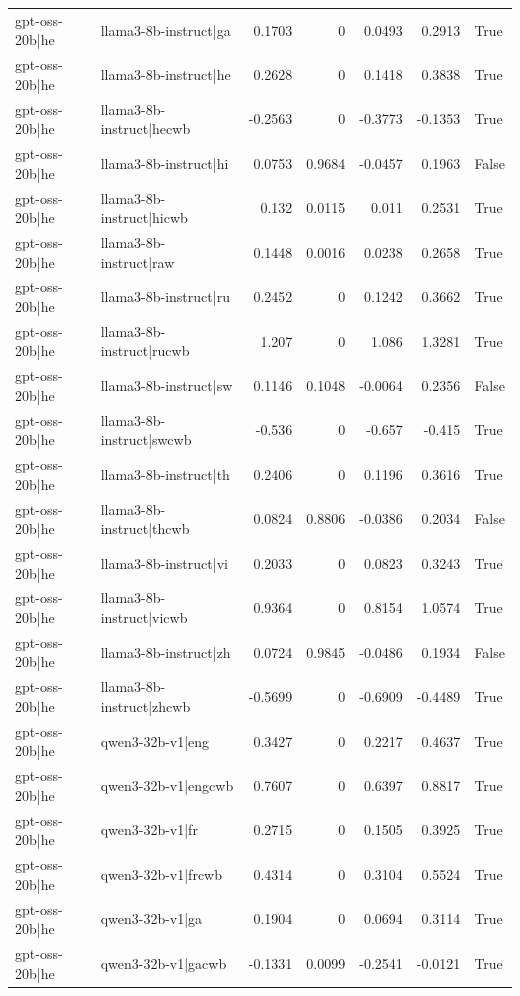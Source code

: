 \begin{table}
\begin{tabular}{l l r r r r l}
gpt-oss-20b|he & llama3-8b-instruct|ga & 0.1703 & 0 & 0.0493 & 0.2913 & True \\
gpt-oss-20b|he & llama3-8b-instruct|he & 0.2628 & 0 & 0.1418 & 0.3838 & True \\
gpt-oss-20b|he & llama3-8b-instruct|hecwb & -0.2563 & 0 & -0.3773 & -0.1353 & True \\
gpt-oss-20b|he & llama3-8b-instruct|hi & 0.0753 & 0.9684 & -0.0457 & 0.1963 & False \\
gpt-oss-20b|he & llama3-8b-instruct|hicwb & 0.132 & 0.0115 & 0.011 & 0.2531 & True \\
gpt-oss-20b|he & llama3-8b-instruct|raw & 0.1448 & 0.0016 & 0.0238 & 0.2658 & True \\
gpt-oss-20b|he & llama3-8b-instruct|ru & 0.2452 & 0 & 0.1242 & 0.3662 & True \\
gpt-oss-20b|he & llama3-8b-instruct|rucwb & 1.207 & 0 & 1.086 & 1.3281 & True \\
gpt-oss-20b|he & llama3-8b-instruct|sw & 0.1146 & 0.1048 & -0.0064 & 0.2356 & False \\
gpt-oss-20b|he & llama3-8b-instruct|swcwb & -0.536 & 0 & -0.657 & -0.415 & True \\
gpt-oss-20b|he & llama3-8b-instruct|th & 0.2406 & 0 & 0.1196 & 0.3616 & True \\
gpt-oss-20b|he & llama3-8b-instruct|thcwb & 0.0824 & 0.8806 & -0.0386 & 0.2034 & False \\
gpt-oss-20b|he & llama3-8b-instruct|vi & 0.2033 & 0 & 0.0823 & 0.3243 & True \\
gpt-oss-20b|he & llama3-8b-instruct|vicwb & 0.9364 & 0 & 0.8154 & 1.0574 & True \\
gpt-oss-20b|he & llama3-8b-instruct|zh & 0.0724 & 0.9845 & -0.0486 & 0.1934 & False \\
gpt-oss-20b|he & llama3-8b-instruct|zhcwb & -0.5699 & 0 & -0.6909 & -0.4489 & True \\
gpt-oss-20b|he & qwen3-32b-v1|eng & 0.3427 & 0 & 0.2217 & 0.4637 & True \\
gpt-oss-20b|he & qwen3-32b-v1|engcwb & 0.7607 & 0 & 0.6397 & 0.8817 & True \\
gpt-oss-20b|he & qwen3-32b-v1|fr & 0.2715 & 0 & 0.1505 & 0.3925 & True \\
gpt-oss-20b|he & qwen3-32b-v1|frcwb & 0.4314 & 0 & 0.3104 & 0.5524 & True \\
gpt-oss-20b|he & qwen3-32b-v1|ga & 0.1904 & 0 & 0.0694 & 0.3114 & True \\
gpt-oss-20b|he & qwen3-32b-v1|gacwb & -0.1331 & 0.0099 & -0.2541 & -0.0121 & True \\

\end{tabular}
\end{table}
